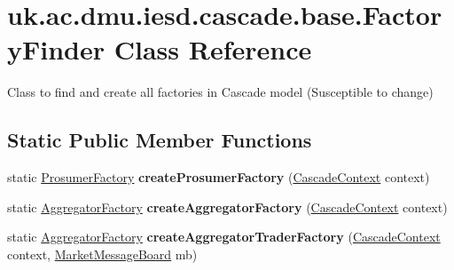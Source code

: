 \hypertarget{classuk_1_1ac_1_1dmu_1_1iesd_1_1cascade_1_1base_1_1_factory_finder}{\section{uk.\-ac.\-dmu.\-iesd.\-cascade.\-base.\-Factory\-Finder Class Reference}
\label{classuk_1_1ac_1_1dmu_1_1iesd_1_1cascade_1_1base_1_1_factory_finder}
}


Class to find and create all factories in Cascade model (Susceptible to change)  


\subsection*{Static Public Member Functions}
\begin{DoxyCompactItemize}
\item 
\hypertarget{classuk_1_1ac_1_1dmu_1_1iesd_1_1cascade_1_1base_1_1_factory_finder_a31a0c2b2a120ace83a3fcb34eca25e28}{static \hyperlink{classuk_1_1ac_1_1dmu_1_1iesd_1_1cascade_1_1agents_1_1prosumers_1_1_prosumer_factory}{Prosumer\-Factory} {\bfseries create\-Prosumer\-Factory} (\hyperlink{classuk_1_1ac_1_1dmu_1_1iesd_1_1cascade_1_1context_1_1_cascade_context}{Cascade\-Context} context)}\label{classuk_1_1ac_1_1dmu_1_1iesd_1_1cascade_1_1base_1_1_factory_finder_a31a0c2b2a120ace83a3fcb34eca25e28}

\item 
\hypertarget{classuk_1_1ac_1_1dmu_1_1iesd_1_1cascade_1_1base_1_1_factory_finder_a55f4123a17706a5567fc2b23914518c0}{static \hyperlink{classuk_1_1ac_1_1dmu_1_1iesd_1_1cascade_1_1agents_1_1aggregators_1_1_aggregator_factory}{Aggregator\-Factory} {\bfseries create\-Aggregator\-Factory} (\hyperlink{classuk_1_1ac_1_1dmu_1_1iesd_1_1cascade_1_1context_1_1_cascade_context}{Cascade\-Context} context)}\label{classuk_1_1ac_1_1dmu_1_1iesd_1_1cascade_1_1base_1_1_factory_finder_a55f4123a17706a5567fc2b23914518c0}

\item 
\hypertarget{classuk_1_1ac_1_1dmu_1_1iesd_1_1cascade_1_1base_1_1_factory_finder_ab0523abd8d016d82dc0c909c34036fce}{static \hyperlink{classuk_1_1ac_1_1dmu_1_1iesd_1_1cascade_1_1agents_1_1aggregators_1_1_aggregator_factory}{Aggregator\-Factory} {\bfseries create\-Aggregator\-Trader\-Factory} (\hyperlink{classuk_1_1ac_1_1dmu_1_1iesd_1_1cascade_1_1context_1_1_cascade_context}{Cascade\-Context} context, \hyperlink{classuk_1_1ac_1_1dmu_1_1iesd_1_1cascade_1_1market_1_1astem_1_1operators_1_1_market_message_board}{Market\-Message\-Board} mb)}\label{classuk_1_1ac_1_1dmu_1_1iesd_1_1cascade_1_1base_1_1_factory_finder_ab0523abd8d016d82dc0c909c34036fce}

\end{DoxyCompactItemize}


